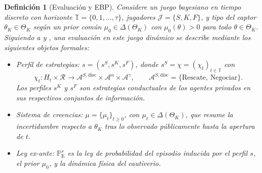 \documentclass[pdflatex,sn-mathphys-ay]{sn-jnl}
\providecommand{\textcite}{\citet}
\theoremstyle{thmstyleone}
\theoremstyle{thmstyletwo}
\theoremstyle{thmstylethree}
\newtheorem{definition}{Definición}
\newcommand{\ProbE}{\mathbb{P}_{\mathrm{E}}}
\newcommand{\ThetaK}{\Theta_K}
\newcommand{\1}{\mathbf{1}}
\begin{document}
\begin{definition}[Evaluación y EBP]
\label{def:pbe-mechanism}
Considere un juego bayesiano en tiempo discreto con horizonte $\mathbb{T}=\{0,1,\ldots,\tau\}$, jugadores $\mathcal{J}=\{S,K,F\}$, y tipo del captor $\theta_K\in\ThetaK$ según un prior común $\mu_0\in\Delta(\ThetaK)$ con $\mu_0(\theta)>0$ para todo $\theta\in\ThetaK$. Siguiendo a \textcite{FudenbergTirole1991} y \textcite{KrepsWilson1982}, una evaluación en este juego dinámico se describe mediante los siguientes objetos formales:

\begin{itemize}
  \item \emph{Perfil de estrategias:} $s=(s^S,s^K,s^F)$, donde $s^S=\chi=(\chi_t)_{t\in\mathbb{T}}$ con
  \[
    \chi_t \colon H_t\times\mathcal{R}
    \longrightarrow \mathcal{A}^{S,\mathrm{disc}}\times\mathcal{A}^{\alpha}\times\mathcal{A}^{\gamma},
    \qquad
    \mathcal{A}^{S,\mathrm{disc}}=\{\text{Rescate},\,\text{Negociar}\}.
  \]
  Los perfiles $s^K$ y $s^F$ son estrategias conductuales de los agentes privados en sus respectivos conjuntos de información.
  \item \emph{Sistema de creencias:} $\mu=\{\mu_t\}_{t\ge 0}$, con $\mu_t\in\Delta(\ThetaK)$, que resume la incertidumbre respecto a $\theta_K$ tras lo observado públicamente hasta la apertura de $t$.
  \item \emph{Ley ex-ante:} $\ProbE^s$ es la ley de probabilidad del episodio inducida por el perfil $s$, el prior $\mu_0$, y la dinámica física del cautiverio.
\end{itemize}


\end{definition}
\end{document}
